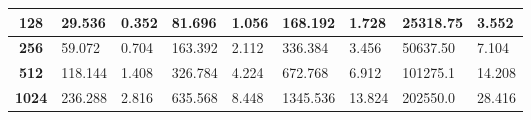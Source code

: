 \begin{table}[H]
\begin{tabular}{|c|l|l|l|l|l|l|l|l|}
\textbf{128}                    & 29.536                                                                           & 0.352                                                                        & 81.696                                                                           & 1.056                                                                        & 168.192                                                                          & 1.728                                                                        & 25318.75                                                                         & 3.552                                                                        \\ \hline
\textbf{256}                    & 59.072                                                                           & 0.704                                                                        & 163.392                                                                          & 2.112                                                                        & 336.384                                                                          & 3.456                                                                        & 50637.50                                                                         & 7.104                                                                        \\ \hline
\textbf{512}                    & 118.144                                                                          & 1.408                                                                        & 326.784                                                                          & 4.224                                                                        & 672.768                                                                          & 6.912                                                                        & 101275.1                                                                         & 14.208                                                                       \\ \hline
\textbf{1024}                   & 236.288                                                                          & 2.816                                                                        & 635.568                                                                          & 8.448                                                                        & 1345.536                                                                         & 13.824                                                                       & 202550.0                                                                         & 28.416                                                                       \\ \hline

\end{tabular}
\end{table}
